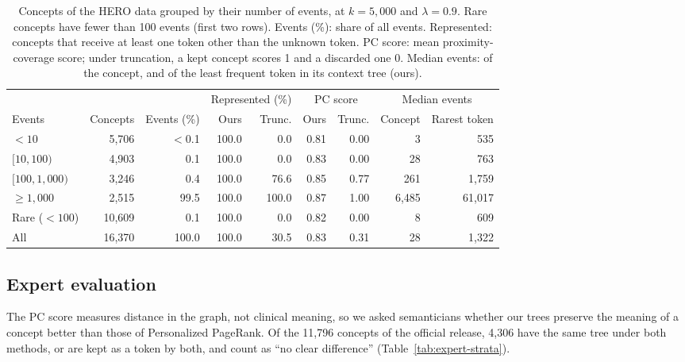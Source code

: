 \begin{table}[t]
\centering
\small
\setlength{\tabcolsep}{4pt}
\begin{tabular}{@{}lrrrrrrrr@{}}
\toprule
 & & & \multicolumn{2}{c}{Represented (\%)} & \multicolumn{2}{c}{PC score} & \multicolumn{2}{c}{Median events} \\
\cmidrule(lr){4-5}\cmidrule(lr){6-7}\cmidrule(l){8-9}
Events & Concepts & Events (\%) & Ours & Trunc. & Ours & Trunc. & Concept & Rarest token \\
\midrule
$<10$             & 5,706  & $<$0.1 & 100.0 & 0.0   & 0.81 & 0.00 & 3     & 535    \\
$[10, 100)$       & 4,903  & 0.1    & 100.0 & 0.0   & 0.83 & 0.00 & 28    & 763    \\
$[100, 1{,}000)$  & 3,246  & 0.4    & 100.0 & 76.6  & 0.85 & 0.77 & 261   & 1,759  \\
$\geq 1{,}000$    & 2,515  & 99.5   & 100.0 & 100.0 & 0.87 & 1.00 & 6,485 & 61,017 \\
\midrule
Rare ($<100$)     & 10,609 & 0.1    & 100.0 & 0.0   & 0.82 & 0.00 & 8     & 609    \\
All               & 16,370 & 100.0  & 100.0 & 30.5  & 0.83 & 0.31 & 28    & 1,322  \\
\bottomrule
\end{tabular}
\caption{Concepts of the HERO data grouped by their number of events, at $k = 5{,}000$ and $\lambda = 0.9$. Rare concepts have fewer than 100 events (first two rows). Events (\%): share of all events. Represented: concepts that receive at least one token other than the unknown token. PC score: mean proximity-coverage score; under truncation, a kept concept scores 1 and a discarded one 0. Median events: of the concept, and of the least frequent token in its context tree (ours).}
\label{tab:hero_bins}
\end{table}

\subsection{Expert evaluation}
\label{sec:results:expert}

The PC score measures distance in the graph, not clinical meaning, so we asked semanticians whether our trees preserve the meaning of a concept better than those of Personalized PageRank.
Of the 11,796 concepts of the official release, 4,306 have the same tree under both methods, or are kept as a token by both, and count as ``no clear difference'' (Table~\ref{tab:expert-strata}).
